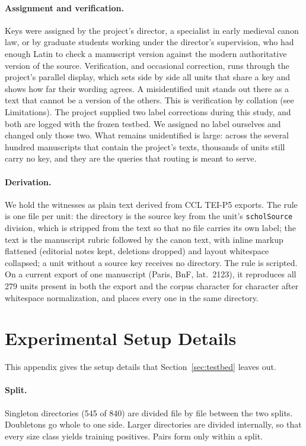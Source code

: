 \documentclass[11pt]{article}
\begin{document}
\paragraph{Assignment and verification.} Keys were assigned by the project's director, a specialist in early medieval canon law, or by graduate students working under the director's supervision, who had enough Latin to check a manuscript version against the modern authoritative version of the source. Verification, and occasional correction, runs through the project's parallel display, which sets side by side all units that share a key and shows how far their wording agrees. A misidentified unit stands out there as a text that cannot be a version of the others. This is verification by collation (see Limitations). The project supplied two label corrections during this study, and both are logged with the frozen testbed. We assigned no label ourselves and changed only those two. What remains unidentified is large: across the several hundred manuscripts that contain the project's texts, thousands of units still carry no key, and they are the queries that routing is meant to serve.

\paragraph{Derivation.} We hold the witnesses as plain text derived from CCL TEI-P5 exports. The rule is one file per unit: the directory is the source key from the unit's \texttt{scholSource} division, which is stripped from the text so that no file carries its own label; the text is the manuscript rubric followed by the canon text, with inline markup flattened (editorial notes kept, deletions dropped) and layout whitespace collapsed; a unit without a source key receives no directory. The rule is scripted. On a current export of one manuscript (Paris, BnF, lat.\ 2123), it reproduces all 279 units present in both the export and the corpus character for character after whitespace normalization, and places every one in the same directory.

\FloatBarrier
\section{Experimental Setup Details}
\label{app:testbed_details}

This appendix gives the setup details that Section~\ref{sec:testbed} leaves out.

\paragraph{Split.}
Singleton directories (545 of 840) are divided file by file between the two splits.
Doubletons go whole to one side.
Larger directories are divided internally, so that every size class yields training positives.
Pairs form only within a split.
\end{document}
